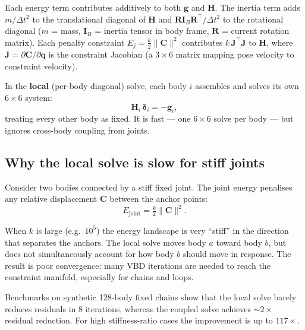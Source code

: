 \documentclass[11pt,a4paper]{article}
\begin{document}
Each energy term contributes additively to both $\mathbf{g}$ and
$\mathbf{H}$.  The inertia term adds $m/\Delta t^2$ to the translational
diagonal of $\mathbf{H}$ and $\mathbf{R}\mathbf{I}_B\mathbf{R}^\top /
\Delta t^2$ to the rotational diagonal ($m$ = mass, $\mathbf{I}_B$ = inertia
tensor in body frame, $\mathbf{R}$ = current rotation matrix).  Each penalty
constraint $E_j = \tfrac{k}{2}\|\mathbf{C}\|^2$ contributes
$k\,\mathbf{J}^\top\mathbf{J}$ to $\mathbf{H}$, where $\mathbf{J} =
\partial \mathbf{C}/\partial \mathbf{q}$ is the constraint Jacobian
(a $3\times 6$ matrix mapping pose velocity to constraint velocity).

In the \textbf{local} (per-body diagonal) solve, each body $i$ assembles
and solves its own $6\times 6$ system:
\begin{equation}
  \mathbf{H}_i \,\boldsymbol{\delta}_i = -\mathbf{g}_i,
  \label{eq:newton_local}
\end{equation}
treating every other body as fixed.  It is fast — one $6\times 6$ solve per
body — but ignores cross-body coupling from joints.

\subsection{Why the local solve is slow for stiff joints}
\label{sec:problem}

Consider two bodies connected by a stiff fixed joint.  The joint energy
penalises any relative displacement $\mathbf{C}$ between the anchor points:
\begin{equation}
  E_\text{joint} = \tfrac{k}{2} \|\mathbf{C}\|^2.
\end{equation}

When $k$ is large (e.g.\ $10^5$) the energy landscape is very ``stiff'' in
the direction that separates the anchors.  The local solve moves body $a$
toward body $b$, but does not simultaneously account for how body $b$ should
move in response.  The result is poor convergence: many VBD iterations are
needed to reach the constraint manifold, especially for chains and loops.

Benchmarks on synthetic 128-body fixed chains show that the local solve
barely reduces residuals in 8 iterations, whereas the coupled solve achieves
$\sim 2\times$ residual reduction.  For high stiffness-ratio cases the
improvement is up to $117\times$.

\end{document}
